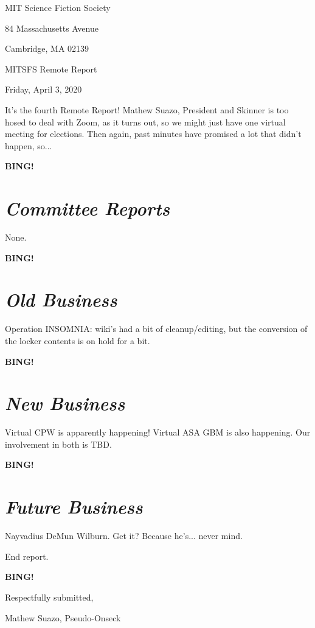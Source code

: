 \documentclass[10pt]{article}
\newcommand{\bing}{{\bf BING!} }
\newcommand{\goto}[1]{\bing \vskip 12pt \section*{{\em{#1}}}}
\newcommand{\skinner}{Mathew Suazo, President and Skinner\xspace}
\newcommand{\onseck}{Mathew Suazo, Pseudo-Onseck\xspace}
\newcommand{\meetingdate}{Friday, April 3, 2020}
\begin{document}
\begin{center}

MIT Science Fiction Society

84 Massachusetts Avenue

Cambridge, MA 02139

\vspace{12pt}

MITSFS Remote Report

\meetingdate

\end{center}

\vspace{18pt}

\setlength{\parskip}{6pt}

\noindent
It's the fourth Remote Report! \skinner is too hosed to deal with Zoom, as it turns out, so we might just have one virtual meeting for elections. Then again, past minutes have promised a lot that didn't happen, so...

\goto{Committee Reports}

None.

\goto{Old Business}

Operation INSOMNIA: wiki's had a bit of cleanup/editing, but the conversion of the locker contents is on hold for a bit.

\goto{New Business}

Virtual CPW is apparently happening! Virtual ASA GBM is also happening. Our involvement in both is TBD.

\goto{Future Business}

Nayvadius DeMun Wilburn. Get it? Because he's... never mind.

\noindent
End report.

\bing
\vspace{18pt}

\centerline{Respectfully submitted,}
\centerline{\onseck}
\end{document}
